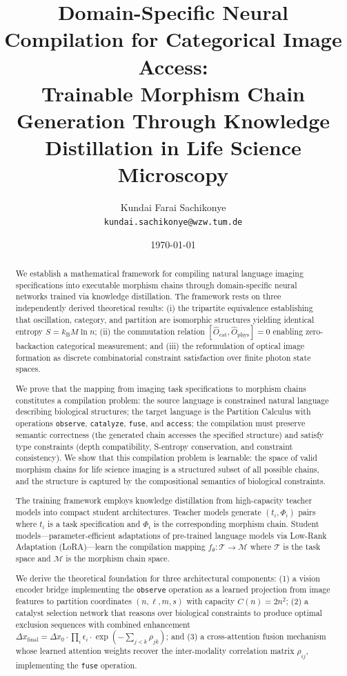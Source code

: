 \documentclass[11pt,twocolumn,a4paper]{article}
\title{Domain-Specific Neural Compilation for Categorical Image Access:\\
\large Trainable Morphism Chain Generation Through Knowledge Distillation in Life Science Microscopy}
\author{
Kundai Farai Sachikonye\\
\texttt{kundai.sachikonye@wzw.tum.de}
}
\date{\today}
\theoremstyle{definition}
\theoremstyle{remark}
\newcommand{\kB}{k_{\mathrm{B}}}
\newcommand{\morphism}{\Phi}
\newcommand{\params}{\theta}
\begin{document}
\maketitle

\begin{abstract}
We establish a mathematical framework for compiling natural language imaging specifications into executable morphism chains through domain-specific neural networks trained via knowledge distillation. The framework rests on three independently derived theoretical results: (i) the tripartite equivalence establishing that oscillation, category, and partition are isomorphic structures yielding identical entropy $S = \kB M \ln n$; (ii) the commutation relation $[\hat{O}_{\mathrm{cat}}, \hat{O}_{\mathrm{phys}}] = 0$ enabling zero-backaction categorical measurement; and (iii) the reformulation of optical image formation as discrete combinatorial constraint satisfaction over finite photon state spaces.

We prove that the mapping from imaging task specifications to morphism chains constitutes a compilation problem: the source language is constrained natural language describing biological structures; the target language is the Partition Calculus with operations \texttt{observe}, \texttt{catalyze}, \texttt{fuse}, and \texttt{access}; the compilation must preserve semantic correctness (the generated chain accesses the specified structure) and satisfy type constraints (depth compatibility, S-entropy conservation, and constraint consistency). We show that this compilation problem is learnable: the space of valid morphism chains for life science imaging is a structured subset of all possible chains, and the structure is captured by the compositional semantics of biological constraints.

The training framework employs knowledge distillation from high-capacity teacher models into compact student architectures. Teacher models generate $(t_i, \morphism_i)$ pairs where $t_i$ is a task specification and $\morphism_i$ is the corresponding morphism chain. Student models---parameter-efficient adaptations of pre-trained language models via Low-Rank Adaptation (LoRA)---learn the compilation mapping $f_\params: \mathcal{T} \to \mathcal{M}$ where $\mathcal{T}$ is the task space and $\mathcal{M}$ is the morphism chain space.

We derive the theoretical foundation for three architectural components: (1) a vision encoder bridge implementing the \texttt{observe} operation as a learned projection from image features to partition coordinates $(n, \ell, m, s)$ with capacity $C(n) = 2n^2$; (2) a catalyst selection network that reasons over biological constraints to produce optimal exclusion sequences with combined enhancement $\Delta x_{\mathrm{final}} = \Delta x_0 \cdot \prod_i \epsilon_i \cdot \exp(-\sum_{j<k} \rho_{jk})$; and (3) a cross-attention fusion mechanism whose learned attention weights recover the inter-modality correlation matrix $\rho_{ij}$, implementing the \texttt{fuse} operation.


\end{abstract}
\end{document}
